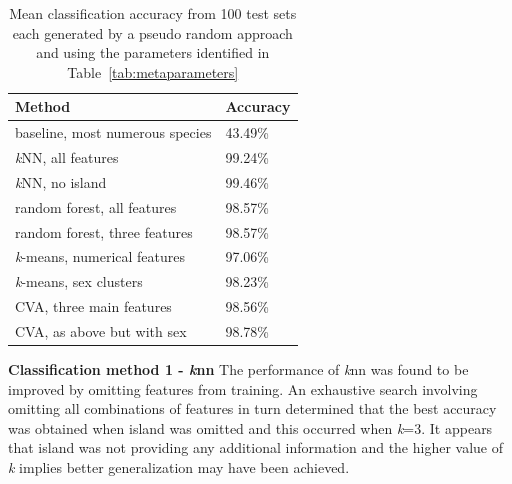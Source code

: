 \documentclass[12pt]{article}
\begin{document}
\begin{table} %
  \small
  \begin{center}
  \vspace{-3\baselineskip} %
  \setlength{\abovecaptionskip}{5pt}
  \setlength{\belowcaptionskip}{5pt}
  \fontsize{10}{10}\selectfont %
  \begin{tabular}{l|l}
  Method & Accuracy\\
  \hline
  baseline, most numerous species & 43.49\% \\
  \hline
  \textit{k}NN, all features	& 99.24\% \\
  \textit{k}NN, no island &	99.46\% \\
  \hline
  random forest, all features	& 98.57\% \\
  random forest, three features	& 98.57\% \\
  \hline
  \textit{k}-means, numerical features & 97.06\% \\
  \textit{k}-means, sex clusters  & 98.23\% \\
  \hline
  CVA, three main features & 98.56\% \\
  CVA, as above but with sex & 98.78\% \\
  \hline
  \end{tabular}
  \vspace{-2\baselineskip} %
  \end{center} 
  \caption{Mean classification accuracy from 100 test sets each generated by a pseudo random approach 
  and using the parameters identified in Table~\ref{tab:metaparameters}}
  \vspace{-1\baselineskip} %
  \label{tab:results}
\end{table} 


\textbf{Classification method 1 - \textit{k}nn}  
The performance of \textit{k}nn was found to be improved by omitting features from training. 
An exhaustive search involving omitting all combinations of features in turn determined that the best accuracy was obtained 
when island was omitted and this occurred when \textit{k}=3. It appears that island was not providing any additional information 
and the higher value of \textit{k} implies better generalization may have been achieved.
\end{document}
